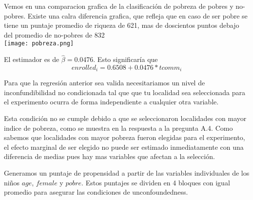 \documentclass[12pt]{article}
\newenvironment{problem}[2][Problem]{\begin{trivlist}
\item[\hskip \labelsep {\bfseries #1}\hskip \labelsep {\bfseries #2.}]}{\end{trivlist}}
\begin{document}
\begin{problem}{A.5}
Vemos en una comparacion grafica de la clasificación de pobreza de pobres y no-pobres. Existe una calra diferencia grafica, que refleja que en caso de ser pobre se tiene un puntaje promedio de riqueza de 621, mas de doscientos puntos debajo del promedio de no-pobres de 832 \\

\centering
\texttt{[image: pobreza.png]}

\end{problem}




\begin{problem}{B.1}
El estimador es de $\hat{\beta}=$0.0476. Esto significaría que
$$enrolled_i=0.6508+0.0476*tcomm_i$$
\end{problem}




\begin{problem}{B.2}
Para que la regresión anterior sea valida necesitariamos un nivel de inconfundibilidad no condicionada tal que que tu localidad sea seleccionada para el experimento ocurra de forma independiente a cualquier otra variable.
\end{problem}



\begin{problem}{B.3}
Esta condición no se cumple debido a que se seleccionaron localidades con mayor indice de pobreza, como se muestra en la respuesta a la pregunta A.4. Como sabemos que localidades con mayor pobreza fueron elegidas para el experimento, el efecto marginal de ser elegido no puede ser estimado inmediatamente con una diferencia de medias pues hay mas variables que afectan a la selección.
\end{problem}




\begin{problem}{D.1}
Generamos un puntaje de propensidad a partir de las variables individuales de los niños $age$, $female$ y $pobre$. Estos puntajes se dividen en 4 bloques con igual promedio para asegurar las condiciones de unconfoundedness.
\end{problem}
\end{document}
